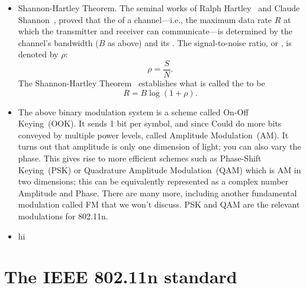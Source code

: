 \begin{itemize}
\item Shannon-Hartley Theorem. The seminal works of Ralph Hartley~\cite{Hartley_law} and Claude Shannon~\cite{Shannon_coding,Shannon_capacity}, proved that the  of a channel---i.e., the maximum data rate $R$ at which the transmitter and receiver can communicate---is determined by the channel's bandwidth ($B$ as above) and its . The signal-to-noise ratio, or , is denoted by $\rho$:
\begin{equation}
\rho = \frac{S}{N}.
\end{equation}
The Shannon-Hartley Theorem~\cite{Shannon_capacity} establishes what is called the  to be
\begin{equation}
R = B\log(1+\rho).
\end{equation}

\item The above binary modulation system is a scheme called On-Off Keying~(OOK). It sends 1 bit per symbol, and since Could do more bits conveyed by multiple power levels, called Amplitude Modulation~(AM). It turns out that amplitude is only one dimension of light; you can also vary the phase. This gives rise to more efficient schemes such as Phase-Shift Keying~(PSK) or Quadrature Amplitude Modulation~(QAM) which is AM in two dimensions; this can be equivalently represented as a complex number Amplitude and Phase. There are many more, including another fundamental modulation called FM that we won't discuss. PSK and QAM are the relevant modulations for 802.11n.
\item hi
\end{itemize}


\section{The IEEE 802.11n standard}

\ifx\mainfile\undefined

\fi
